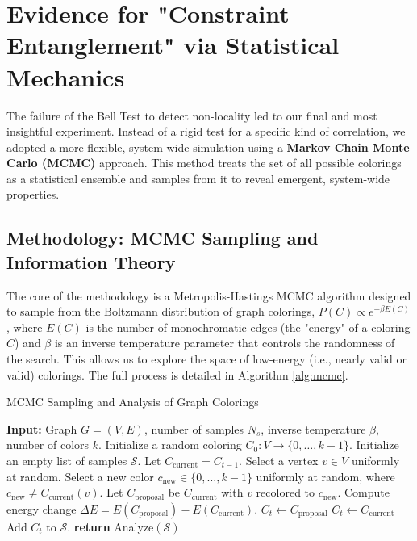 \documentclass[12pt, letterpaper]{article}
\begin{document}
\section{Evidence for "Constraint Entanglement" via Statistical Mechanics}

The failure of the Bell Test to detect non-locality led to our final and most insightful experiment. Instead of a rigid test for a specific kind of correlation, we adopted a more flexible, system-wide simulation using a \textbf{Markov Chain Monte Carlo (MCMC)} approach. This method treats the set of all possible colorings as a statistical ensemble and samples from it to reveal emergent, system-wide properties.

\subsection{Methodology: MCMC Sampling and Information Theory}
The core of the methodology is a Metropolis-Hastings MCMC algorithm designed to sample from the Boltzmann distribution of graph colorings, $P(C) \propto e^{-\beta E(C)}$, where $E(C)$ is the number of monochromatic edges (the "energy" of a coloring $C$) and $\beta$ is an inverse temperature parameter that controls the randomness of the search. This allows us to explore the space of low-energy (i.e., nearly valid or valid) colorings. The full process is detailed in Algorithm \ref{alg:mcmc}.

\begin{algorithm}
\caption{MCMC Sampling and Analysis of Graph Colorings}
\label{alg:mcmc}
\begin{algorithmic}[1]
\State \textbf{Input:} Graph $G=(V,E)$, number of samples $N_s$, inverse temperature $\beta$, number of colors $k$.
\State Initialize a random coloring $C_0: V \to \{0, \ldots, k-1\}$.
\State Initialize an empty list of samples $\mathcal{S}$.
    \State Let $C_{\text{current}} = C_{t-1}$.
    \State Select a vertex $v \in V$ uniformly at random.
    \State Select a new color $c_{\text{new}} \in \{0, \ldots, k-1\}$ uniformly at random, where $c_{\text{new}} \neq C_{\text{current}}(v)$.
    \State Let $C_{\text{proposal}}$ be $C_{\text{current}}$ with $v$ recolored to $c_{\text{new}}$.
    \State Compute energy change $\Delta E = E(C_{\text{proposal}}) - E(C_{\text{current}})$.
        \State $C_t \leftarrow C_{\text{proposal}}$ 
    \Else
        \State $C_t \leftarrow C_{\text{current}}$ 
    \EndIf
    \State Add $C_t$ to $\mathcal{S}$.
\EndFor
\State \textbf{return} Analyze$(\mathcal{S})$
\end{algorithmic}
\end{algorithm}
\end{document}
